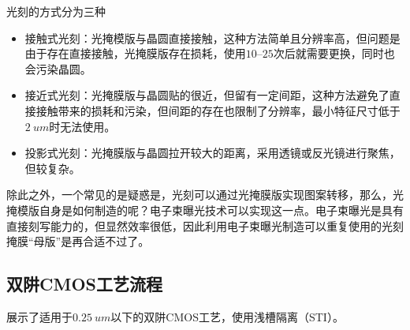 光刻的方式分为三种
\begin{itemize}
    \item 接触式光刻：光掩模版与晶圆直接接触，这种方法简单且分辨率高，但问题是由于存在直接接触，光掩膜版存在损耗，使用$\numrange{10}{25}$次后就需要更换，同时也会污染晶圆。
    \item 接近式光刻：光掩膜版与晶圆贴的很近，但留有一定间距，这种方法避免了直接接触带来的损耗和污染，但间距的存在也限制了分辨率，最小特征尺寸低于$\SI{2}{um}$时无法使用。
    \item 投影式光刻：光掩膜版与晶圆拉开较大的距离，采用透镜或反光镜进行聚焦，但较复杂。
\end{itemize}
除此之外，一个常见的是疑惑是，光刻可以通过光掩膜版实现图案转移，那么，光掩模版自身是如何制造的呢？电子束曝光技术可以实现这一点。电子束曝光是具有直接刻写能力的，但显然效率很低，因此利用电子束曝光制造可以重复使用的光刻掩膜“母版”是再合适不过了。

\subsection{双阱CMOS工艺流程}

展示了适用于$\SI{0.25}{um}$以下的双阱CMOS工艺，使用浅槽隔离（STI）。

